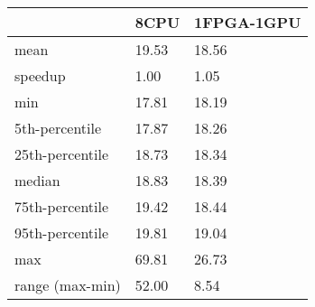 \begin{tabular}{lll}
\toprule
 & 8CPU & 1FPGA-1GPU \\
\midrule
mean & 19.53 & 18.56 \\
speedup & 1.00 & 1.05 \\
min & 17.81 & 18.19 \\
5th-percentile & 17.87 & 18.26 \\
25th-percentile & 18.73 & 18.34 \\
median & 18.83 & 18.39 \\
75th-percentile & 19.42 & 18.44 \\
95th-percentile & 19.81 & 19.04 \\
max & 69.81 & 26.73 \\
range (max-min) & 52.00 & 8.54 \\
\bottomrule
\end{tabular}

